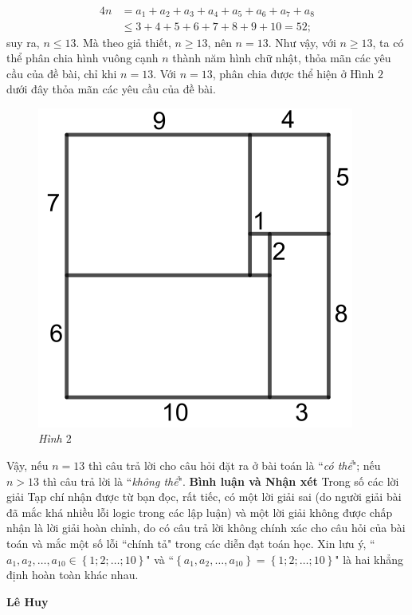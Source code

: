 \begin{multicols}{2}
\begin{align*}
		4n &= {a_1} + {a_2} + {a_3} + {a_4} + {a_5} + {a_6} + {a_7} + {a_8} \\
		&\le 3 + 4 + 5 + 6 + 7 + 8 + 9 + 10 = 52;
	\end{align*}
	suy ra, $n \le 13$. Mà theo giả thiết, $n \ge 13$, nên $n = 13$.
	\vskip 0.05cm
	Như vậy, với $n \ge 13$, ta có thể phân chia hình vuông cạnh $n$ thành năm hình chữ nhật, thỏa mãn các yêu cầu của đề bài, chỉ khi $n = 13$.
	\vskip 0.05cm
	Với $n = 13$, phân chia được thể hiện ở Hình $2$ dưới đây thỏa mãn các yêu cầu của đề bài.
	\begin{figure}[H]
		\vspace*{-5pt}
		\centering
		\captionsetup{labelformat= empty, justification=centering}
		\includegraphics[width= 0.6\linewidth]{P666H2}
		\caption{\small\textit{\color{thachthuctoanhoc}Hình $2$}}
		\vspace*{-10pt}
	\end{figure}
	Vậy, nếu $n = 13$ thì câu trả lời cho câu hỏi đặt ra ở bài toán là ``\textit{có thể}"; nếu $n > 13$ thì câu trả lời là ``\textit{không thể}".
	\vskip 0.05cm
	\textbf{\color{thachthuctoanhoc}Bình luận và Nhận xét}
	\vskip 0.05cm
	Trong số các lời giải Tạp chí nhận được từ bạn đọc, rất tiếc, có một lời giải sai (do người giải bài đã mắc khá nhiều lỗi logic trong các lập luận) và một lời giải không được chấp nhận là lời giải hoàn chỉnh, do có câu trả lời không chính xác cho câu hỏi của bài toán và mắc một số lỗi ``chính tả" trong các diễn đạt toán học.
	\vskip 0.05cm
	Xin lưu ý, ``${a_1},{a_2}, \ldots ,{a_{10}} \in \left\{ {1;2; \ldots ;10} \right\}$" và ``$\left\{ {{a_1},{a_2}, \ldots ,{a_{10}}} \right\} = \left\{ {1;2; \ldots ;10} \right\}$" là hai khẳng định hoàn toàn khác nhau.
	\begin{flushright}
		\textbf{\color{thachthuctoanhoc}Lê Huy}

\end{flushright}
\end{multicols}
